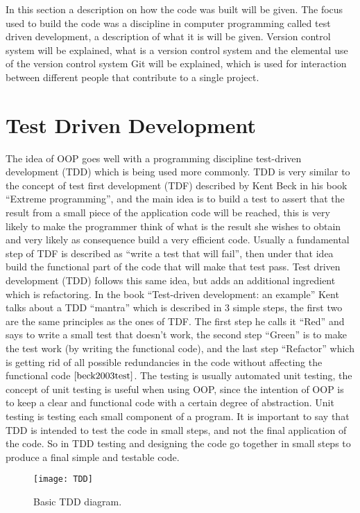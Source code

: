 
In this section a description on how the code was built will be given. The focus used to build the code was a discipline in computer programming called test driven development, a description of what it is will be given. Version control system will be explained, what is a version control system and the elemental use of the version control system Git will be explained, which is used for interaction between different people that contribute to a single project. 


\section{Test Driven Development}
The idea of OOP goes well with a programming discipline test-driven development (TDD) which is being used more commonly. TDD is very similar to the concept of test first development (TDF) described by Kent Beck in his book ``Extreme programming'', and the main idea is to build a test to assert that the result from a small piece of the application code will be reached, this is very likely to make the programmer think of what is the result she wishes to obtain and very likely as consequence build a very efficient code. Usually a fundamental  step of TDF is described as ``write a test that will fail'', then under that idea build the functional part of the code that will make that test pass. Test driven development (TDD) follows this same idea, but adds an additional ingredient which is refactoring. In the book ``Test-driven development: an example'' Kent talks about a TDD ``mantra'' which is described in 3 simple steps, the first two are the same principles as the ones of TDF. The first step he calls it ``Red'' and says to write a small test that doesn't work, the second step ``Green'' is to make the test work (by writing the functional code), and the last step ``Refactor'' which is getting rid of all possible redundancies in the code without affecting the functional code $\cite{beck2003test}$. The testing is usually automated unit testing, the concept of unit testing is useful when using OOP, since the intention of OOP is to keep a clear and functional code with a certain degree of abstraction. Unit testing is testing each small component of a program. It is important to say that TDD is intended to test the code in small steps, and not the final application of the code. So in TDD testing and designing the code go together in small steps to produce a final simple and testable code. 

\begin{figure}[h]
\begin{center}
	\texttt{[image: TDD]}

\caption{Basic TDD diagram.}
\label{tab:tdddiag}
\end{center}
\end{figure}

